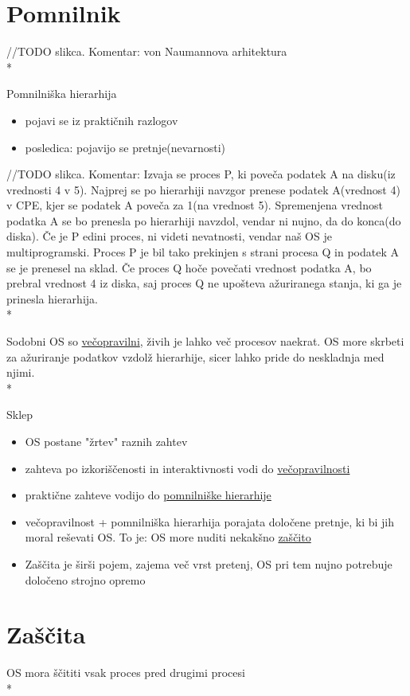 \documentclass[
  slovene,
  a4paper
]{book}
\begin{document}
\section{Pomnilnik}

//TODO slikca. Komentar: von Naumannova arhitektura\\*

Pomnilniška hierarhija
\begin{itemize}
  \item pojavi se iz praktičnih razlogov
  \item posledica: pojavijo se pretnje(nevarnosti)
\end{itemize}

//TODO slikca. Komentar: Izvaja se proces P, ki poveča podatek A na disku(iz 
vrednosti 4 v 5). Najprej se po hierarhiji navzgor prenese podatek A(vrednost 4)
v CPE, kjer  se podatek A poveča za 1(na vrednost 5). Spremenjena vrednost 
podatka A se bo prenesla po hierarhiji navzdol, vendar ni nujno, da do konca(do
diska). Če je P edini proces, ni videti nevatnosti, vendar naš OS je
multiprogramski. Proces P je bil tako prekinjen s strani procesa Q in podatek A
se je prenesel na sklad. Če proces Q hoče povečati vrednost podatka A, bo
prebral vrednost 4 iz diska, saj proces Q ne upošteva ažuriranega stanja, ki ga
je prinesla hierarhija.\\*

Sodobni OS so \underline{večopravilni}, živih je lahko več procesov naekrat. OS
more skrbeti za ažuriranje podatkov vzdolž hierarhije, sicer lahko pride do
neskladnja med njimi.\\*

Sklep
\begin{itemize}
  \item OS postane "žrtev" raznih zahtev
  \item zahteva po izkoriščenosti in interaktivnosti vodi do 
      \underline{večopravilnosti}
  \item praktične zahteve vodijo do \underline{pomnilniške hierarhije}
  \item večopravilnost + pomnilniška hierarhija porajata določene pretnje, ki
        bi jih moral reševati OS. To je: OS more nuditi nekakšno
        \underline{zaščito}
  \item Zaščita je širši pojem, zajema več vrst pretenj, OS pri tem nujno
      potrebuje določeno strojno opremo
\end{itemize}

\section{Zaščita}
OS mora ščititi vsak proces pred drugimi procesi\\*
\end{document}

